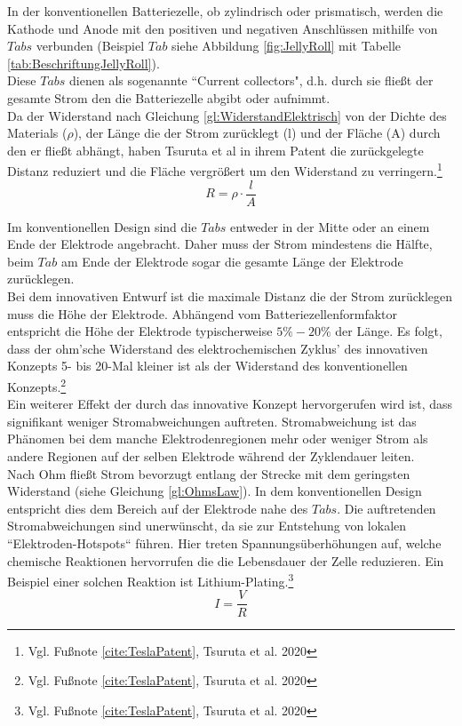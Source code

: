 In der konventionellen Batteriezelle, ob zylindrisch oder prismatisch, werden die Kathode und Anode mit den positiven und negativen Anschlüssen mithilfe von $Tabs$ verbunden (Beispiel $Tab$ siehe Abbildung \ref{fig:JellyRoll} mit Tabelle \ref{tab:BeschriftungJellyRoll}). \\
Diese $Tabs$ dienen als sogenannte ``Current collectors", d.h. durch sie fließt der gesamte Strom den die Batteriezelle abgibt oder aufnimmt. \\
Da der Widerstand nach Gleichung \ref{gl:WiderstandElektrisch} von der Dichte des Materials ($\rho$), der Länge die der Strom zurücklegt (l) und der Fläche (A) durch den er fließt abhängt, haben Tsuruta et al in ihrem Patent die zurückgelegte Distanz reduziert und die Fläche vergrößert um den Widerstand zu verringern.\footnote{Vgl. Fußnote \ref{cite:TeslaPatent}, Tsuruta et al. 2020}
\begin{equation}
	R = \rho \cdot \frac{l}{A}
	\label{gl:WiderstandElektrisch}
\end{equation}

Im konventionellen Design sind die $Tabs$ entweder in der Mitte oder an einem Ende der Elektrode angebracht. Daher muss der Strom mindestens die Hälfte, beim $Tab$ am Ende der Elektrode sogar die gesamte Länge der Elektrode zurücklegen. \\
Bei dem innovativen Entwurf ist die maximale Distanz die der Strom zurücklegen muss die Höhe der Elektrode. Abhängend vom Batteriezellenformfaktor entspricht die Höhe der Elektrode typischerweise $5\percent-20\percent$ der Länge. Es folgt, dass der ohm'sche Widerstand des elektrochemischen Zyklus' des innovativen Konzepts 5- bis 20-Mal kleiner ist als der Widerstand des konventionellen Konzepts.\footnote{Vgl. Fußnote \ref{cite:TeslaPatent}, Tsuruta et al. 2020}\\
Ein weiterer Effekt der durch das innovative Konzept hervorgerufen wird ist, dass signifikant weniger Stromabweichungen auftreten. Stromabweichung ist das Phänomen bei dem manche Elektrodenregionen mehr oder weniger Strom als andere Regionen auf der selben Elektrode während der Zyklendauer leiten.\\
Nach Ohm fließt Strom bevorzugt entlang der Strecke mit dem geringsten Widerstand (siehe Gleichung \ref{gl:OhmsLaw}). In dem konventionellen Design entspricht dies dem Bereich auf der Elektrode nahe des $Tabs$. Die auftretenden Stromabweichungen sind unerwünscht, da sie zur Entstehung von lokalen ``Elektroden-Hotspots`` führen. Hier treten Spannungsüberhöhungen auf, welche chemische Reaktionen hervorrufen die die Lebensdauer der Zelle reduzieren. Ein Beispiel einer solchen Reaktion ist Lithium-Plating.\footnote{Vgl. Fußnote \ref{cite:TeslaPatent}, Tsuruta et al. 2020}
\begin{equation}
	I = \frac{V}{R}
	\label{gl:OhmsLaw}
\end{equation}

